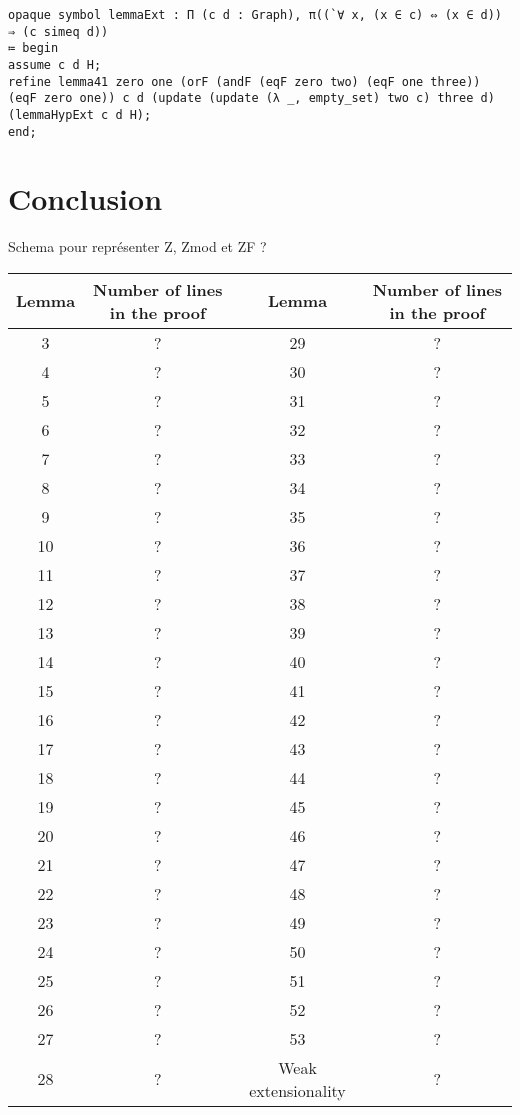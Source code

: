 \documentclass[a4paper]{article}
\begin{document}
\begin{lstlisting}
opaque symbol lemmaExt : Π (c d : Graph), π((`∀ x, (x ∈ c) ⇔ (x ∈ d)) ⇒ (c simeq d))
≔ begin
assume c d H;
refine lemma41 zero one (orF (andF (eqF zero two) (eqF one three)) (eqF zero one)) c d (update (update (λ _, empty_set) two c) three d) (lemmaHypExt c d H);
end;
\end{lstlisting}

\section{Conclusion}

Schema pour représenter Z, Zmod et ZF ?

\begin{center}
\begin{tabular}{|c|c||c|c|}
\hline Lemma & Number of lines in the proof & Lemma & Number of lines in the proof \\
\hline 3 & ? & 29 & ? \\
\hline 4 & ? & 30 & ? \\
\hline 5 & ? & 31 & ? \\
\hline 6 & ? & 32 & ? \\
\hline 7 & ? & 33 & ? \\
\hline 8 & ? & 34 & ? \\
\hline 9 & ? & 35 & ? \\
\hline 10 & ? & 36 & ? \\
\hline 11 & ? & 37 & ? \\
\hline 12 & ? & 38 & ? \\
\hline 13 & ? & 39 & ? \\
\hline 14 & ? & 40 & ? \\
\hline 15 & ? & 41 & ? \\
\hline 16 & ? & 42 & ? \\
\hline 17 & ? & 43 & ? \\
\hline 18 & ? & 44 & ? \\
\hline 19 & ? & 45 & ? \\
\hline 20 & ? & 46 & ? \\
\hline 21 & ? & 47 & ? \\
\hline 22 & ? & 48 & ? \\
\hline 23 & ? & 49 & ? \\
\hline 24 & ? & 50 & ? \\
\hline 25 & ? & 51 & ? \\
\hline 26 & ? & 52 & ? \\
\hline 27 & ? & 53 & ? \\
\hline 28 & ? & Weak extensionality & ? \\
\hline
\end{tabular}
\end{center}

\printbibliography
\end{document}
